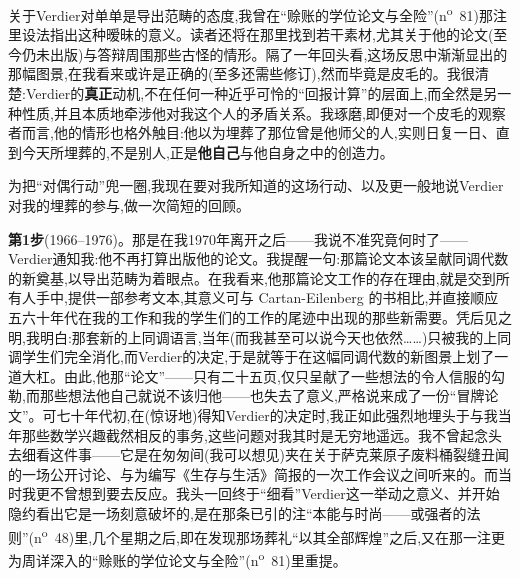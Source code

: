 关于Verdier对单单是导出范畴的态度,我曾在“赊账的学位论文与全险”(n\textsuperscript{o}~81)那注里设法指出这种暧昧的意义。读者还将在那里找到若干素材,尤其关于他的论文(至今仍未出版)与答辩周围那些古怪的情形。隔了一年回头看,这场反思中渐渐显出的那幅图景,在我看来或许是正确的(至多还需些修订),然而毕竟是皮毛的。我很清楚:Verdier的\textbf{真正}动机,不在任何一种近乎可怜的“回报计算”的层面上,而全然是另一种性质,并且本质地牵涉他对我这个人的矛盾关系。我琢磨,即便对一个皮毛的观察者而言,他的情形也格外触目:他以为埋葬了那位曾是他师父的人,实则日复一日、直到今天所埋葬的,不是别人,正是\textbf{他自己}与他自身之中的创造力。

为把“对偶行动”兜一圈,我现在要对我所知道的这场行动、以及更一般地说Verdier对我的埋葬的参与,做一次简短的回顾。

\textbf{第1步}(1966--1976)。那是在我1970年离开之后——我说不准究竟何时了——Verdier通知我:他不再打算出版他的论文。我提醒一句:那篇论文本该呈献同调代数的新奠基,以导出范畴为着眼点。在我看来,他那篇论文工作的存在理由,就是交到所有人手中,提供一部参考文本,其意义可与 Cartan-Eilenberg 的书相比,并直接顺应\dmark{}五六十年代在我的工作和我的学生们的工作的尾迹中出现的那些新需要。凭后见之明,我明白:那套新的上同调语言,当年(而我甚至可以说今天也依然……)只被我的上同调学生们完全消化,而Verdier的决定,于是就等于在这幅同调代数的新图景上划了一道大杠。由此,他那“论文”——只有二十五页,仅只呈献了一些想法的令人信服的勾勒,而那些想法他自己就说不该归他——也失去了意义,严格说来成了一份“冒牌论文”。可七十年代初,在(惊讶地)得知Verdier的决定时,我正如此强烈地埋头于与我当年那些数学兴趣截然相反的事务,这些问题对我其时是无穷地遥远。我不曾起念头去细看这件事——它是在匆匆间(我可以想见)夹在关于萨克莱原子废料桶裂缝丑闻的一场公开讨论、与为编写《生存与生活》简报的一次工作会议之间听来的。而当时我更不曾想到要去反应。我头一回终于“细看”Verdier这一举动之意义、并开始隐约看出它是一场刻意破坏的,是在那条已引的注“本能与时尚——或强者的法则”(n\textsuperscript{o}~48)里,几个星期之后,即在发现那场葬礼“以其全部辉煌”之后,又在那一注更为周详深入的“赊账的学位论文与全险”(n\textsuperscript{o}~81)里重提。

